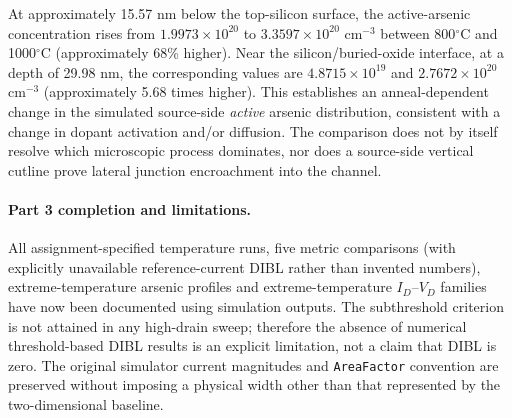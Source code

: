 At approximately 15.57 nm below the top-silicon surface, the
active-arsenic concentration rises from $1.9973\times10^{20}$
to $3.3597\times10^{20}$ cm$^{-3}$ between 800$^\circ$C and
1000$^\circ$C (approximately 68\% higher). Near the silicon/buried-oxide
interface, at a depth of 29.98 nm, the corresponding values are
$4.8715\times10^{19}$ and $2.7672\times10^{20}$
cm$^{-3}$ (approximately 5.68 times higher).
This establishes an anneal-dependent change in the simulated
source-side \emph{active} arsenic distribution, consistent with
a change in dopant activation and/or diffusion.
The comparison does not by itself resolve which microscopic
process dominates, nor does a source-side vertical cutline
prove lateral junction encroachment into the channel.

\paragraph{Part 3 completion and limitations.}
All assignment-specified temperature runs, five metric
comparisons (with explicitly unavailable reference-current
DIBL rather than invented numbers), extreme-temperature
arsenic profiles and extreme-temperature $I_D$--$V_D$
families have now been documented using simulation outputs.
The subthreshold criterion is not attained in any high-drain
sweep; therefore the absence of numerical threshold-based
DIBL results is an explicit limitation, not a claim that
DIBL is zero. The original simulator current magnitudes and \texttt{AreaFactor}
convention are preserved without imposing a physical width
other than that represented by the two-dimensional baseline.
